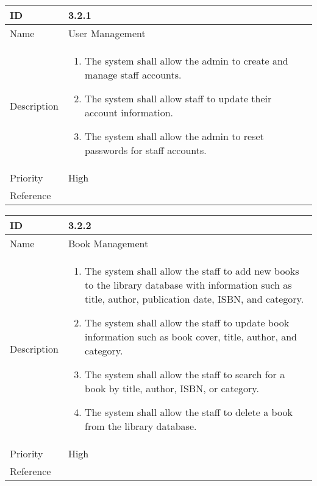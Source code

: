 \begin{center}

\begin{tabular}{ | m{5em} | m{6.5cm}|  } 
  \hline
  ID & 3.2.1\\ 
  \hline
  Name & User Management \\ 
  \hline
  Description & 
  \begin{enumerate}
      \item The system shall allow the admin to create and manage staff accounts.
      \item The system shall allow staff to update their account information.
      \item The system shall allow the admin to reset passwords for staff accounts.

  \end{enumerate} \\
  \hline
  
  Priority & High\\
  \hline 
  Reference & \\
  \hline
\end{tabular}
\end{center}

\begin{center}
\begin{tabular}{ | m{5em} | m{6.5cm}|  } 
  \hline
  ID & 3.2.2\\ 
  \hline
  Name &  Book Management\\ 
  \hline
  Description & 
  \begin{enumerate}
      \item  The system shall allow the staff to add new books to the library database with information such as title, author, publication date, ISBN, and category.
      \item The system shall allow the staff to update book information such as book cover, title, author, and category.
      \item The system shall allow the staff to search for a book by title, author, ISBN, or category.
      \item The system shall allow the staff to delete a book from the library database.


  \end{enumerate} \\
  \hline
  
  Priority & High\\
  \hline
  Reference & \\
  \hline
\end{tabular}
\end{center}

